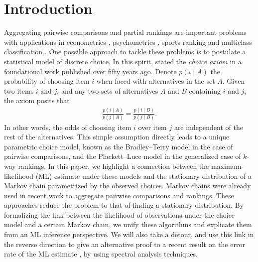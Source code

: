 \section{Introduction}
\label{fi:sec:intro}

Aggregating pairwise comparisons and partial rankings are important problems with applications in econometrics \citep{mcfadden1973conditional}, psychometrics \citep{thurstone1927method, bradley1952rank}, sports ranking \citep{plackett1975analysis, elo1978rating} and multiclass classification \citep{hastie1998classification}.
One possible approach to tackle these problems is to postulate a statistical model of discrete choice.
In this spirit, \citet{luce1959individual} stated the \emph{choice axiom} in a foundational work published over fifty years ago.
Denote $p(i \mid A)$ the probability of choosing item $i$ when faced with alternatives in the set $A$.
Given two items $i$ and $j$, and any two sets of alternatives $A$ and $B$ containing $i$ and $j$, the axiom posits that
\begin{align*}
\frac{p(i \mid A)}{p(j \mid A)}
= \frac{p(i \mid B)}{p(j \mid B)}.
\end{align*}
In other words, the odds of choosing item $i$ over item $j$ are independent of the rest of the alternatives.
This simple assumption directly leads to a unique parametric choice model, known as the Bradley--Terry model in the case of pairwise comparisons, and the Plackett--Luce model in the generalized case of $k$-way rankings.
In this paper, we highlight a connection between the maximum-likelihood (ML) estimate under these models and the stationary distribution of a Markov chain parametrized by the observed choices.
Markov chains were already used in recent work \citep{dwork2001rank, negahban2012iterative, azari2013generalized} to aggregate pairwise comparisons and rankings.
These approaches reduce the problem to that of finding a stationary distribution.
By formalizing the link between the likelihood of observations under the choice model and a certain Markov chain, we unify these algorithms and explicate them from an ML inference perspective.
We will also take a detour, and use this link in the reverse direction to give an alternative proof to a recent result on the error rate of the ML estimate \cite{hajek2014minimax}, by using spectral analysis techniques.

